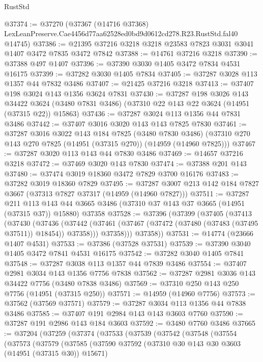 \begin{lexlean}{RustStd}
\begin{coremodule}
@37374 := @37270
    (@37367
      (@14716 @37368)
      LexLeanPreserve.Cae4456d77aa62528ed0bd9d0612cd278.R23.RustStd.fal40
      @14745)
@37386 := @21395 @37216 @3218 @3218 @23583 @7823 @3031 @3041 @1407 @3472 @7835 @3472 @7842
@37388 := @14761 @37216 @3218
@37390 := @37388 @497 @1407
@37396 := @37390 @3030 @1405 @3472 @7834 @4531 @16175
@37399 := @37282 @3030 @1405 @7834
@37405 := @37287 @3028 @113 @1357 @44 @7832 @3486
@37407 := @21425 @37216 @3218
@37413 := @37407 @198 @3024 @143 @1356 @3624 @7831
@37430 := @37287
    @198
    @3026
    @143
    @34422
    @3624
    (@3480 @7831 @3486)
    (@37310 @22 @143 @22 @3624 (@14951 (@37315 @22)) @15863)
@37436 := @37287 @3024 @113 @1356 @44 @7831 @3486
@37442 := @37407 @3016 @3020 @143 @143 @7825 @7830
@37461 := @37287
    @3016
    @3022
    @143
    @184
    @7825
    (@3480 @7830 @3486)
    (@37310 @270 @143 @270 @7825 (@14951 (@37315 @270)) (@14959 (@14960 @7825)))
@37467 := @37287 @3020 @113 @143 @44 @7830 @3486
@37469 := @14657 @37216 @3218
@37472 := @37469 @3020 @143 @7830
@37474 := @37388 @201 @143
@37480 := @37474 @3019 @18360 @3472 @7829 @3700 @16176
@37483 := @37282 @3019 @18360 @7829
@37495 := @37287 @3007 @213 @142 @184 @7827 @3667 (@37313 @7827 @37317 (@14959 (@14960 @7827)))
@37511 := @37287
    @211
    @113
    @143
    @44
    @3665
    @3486
    (@37310 @37 @143 @37 @3665 (@14951 (@37315 @37)) @15880)
    @37358
@37528 := @37396
    (@37399
      (@37405
        (@37413
          (@37430
            (@37436
              (@37442 (@37461 (@37467 (@37472 (@37480 (@37483 (@37495 @37511)) @18454)) @37358)))
              @37358)))
        @37358))
@37531 := @14774 (@23666 @1407 @4531)
@37533 := @37386 (@37528 @37531)
@37539 := @37390 @3040 @1405 @3472 @7841 @4531 @16175
@37542 := @37282 @3040 @1405 @7841
@37548 := @37287 @3038 @113 @1357 @44 @7839 @3486
@37554 := @37407 @2981 @3034 @143 @1356 @7756 @7838
@37562 := @37287 @2981 @3036 @143 @34422 @7756 (@3480 @7838 @3486)
@37569 := @37310 @250 @143 @250 @7756 (@14951 (@37315 @250))
@37571 := @14959 (@14960 @7756)
@37573 := @37562 (@37569 @37571)
@37579 := @37287 @3034 @113 @1356 @44 @7838 @3486
@37585 := @37407 @191 @2984 @143 @143 @3603 @7760
@37590 := @37287 @191 @2986 @143 @184 @3603
@37592 := @3480 @7760 @3486
@37665 := @37204
    (@37259
      (@37374
        (@37533
          (@37539
            (@37542
              (@37548
                (@37554
                  (@37573
                    (@37579
                      (@37585
                        (@37590
                          @37592
                          (@37310 @30 @143 @30 @3603 (@14951 (@37315 @30)) @15671)

\end{coremodule}
\end{lexlean}
